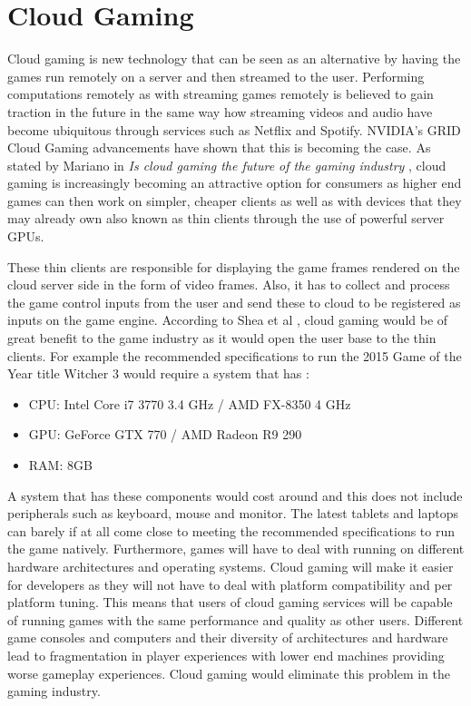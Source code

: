 \section{Cloud Gaming}
Cloud gaming is new technology that can be seen as an alternative by having the games run remotely on a server and then streamed to the user. Performing computations remotely as with streaming games remotely is believed to gain traction in the future in the same way how streaming videos and audio have become ubiquitous through services such as Netflix and Spotify. NVIDIA's GRID Cloud Gaming advancements have shown that this is becoming the case. As stated by Mariano in \textit{Is cloud gaming the future of the gaming industry} \cite{mariano2015cloud}, cloud gaming is increasingly becoming an attractive option for consumers as higher end games can then work on simpler, cheaper clients as well as with devices that they may already own also known as thin clients through the use of powerful server GPUs.
\newline
\par
These thin clients are responsible for displaying the game frames rendered on the cloud server side in the form of video frames. Also, it has to collect and process the game control inputs from the user and send these to cloud to be registered as inputs on the game engine. According to Shea et al \cite{shea2013cloud}, cloud gaming would be of great benefit to the game industry as it would open the user base to the thin clients. For example the recommended specifications to run the 2015 Game of the Year title Witcher 3\cite{goty2015} would require a system that has \cite{witcher}:
\begin{itemize}
 \item CPU: Intel Core i7 3770 3.4 GHz / AMD FX-8350 4 GHz
 \item GPU: GeForce GTX 770 / AMD Radeon R9 290
 \item RAM: 8GB
\end{itemize}
A system that has these components would cost around  and this does not include peripherals such as keyboard, mouse and monitor. The latest tablets and laptops can barely if at all come close to meeting the recommended specifications to run the game natively. Furthermore, games will have to deal with running on different hardware architectures and operating systems. Cloud gaming will make it easier for developers as they will not have to deal with platform compatibility and per platform tuning. This means that users of cloud gaming services will be capable of running games with the same performance and quality as other users. Different game consoles and computers and their diversity of architectures and hardware lead to fragmentation in player experiences with lower end machines providing worse gameplay experiences. Cloud gaming would eliminate this problem in the gaming industry.
